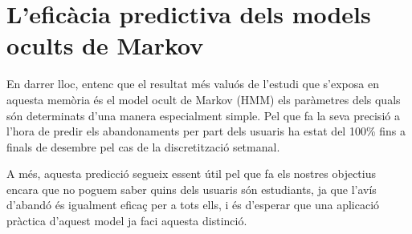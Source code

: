 \documentclass[
	a4paper,
	twoside,
	justified
]{tufte-book}
\begin{document}
\section{L'eficàcia predictiva dels models ocults de Markov}  

En darrer lloc, entenc que el resultat més valuós de l'estudi que s'exposa en aquesta memòria és el model ocult de Markov (HMM) els paràmetres dels quals són determinats d'una manera especialment simple. Pel que fa la seva precisió a l'hora de predir els abandonaments per part dels usuaris ha estat del 100\% fins a finals de desembre pel cas de la discretització setmanal. 

A més, aquesta predicció segueix essent útil pel que fa els nostres objectius encara que no poguem saber quins dels usuaris són estudiants, ja que l'avís d'abandó és igualment eficaç per a tots ells, i és d'esperar que una aplicació pràctica d'aquest model ja faci aquesta distinció.  	  
 
\backmatter


\end{document}
